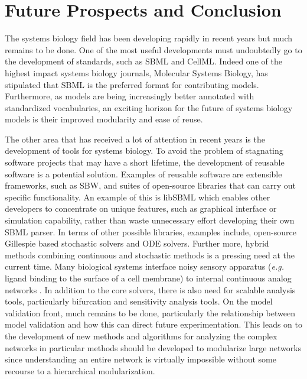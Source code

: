 \documentclass[]{article}
\begin{document}
\section{Future Prospects and Conclusion}

The systems biology field has been developing rapidly in recent years
but much remains to be done. One of the most useful developments must
undoubtedly go to the development of standards, such as SBML and CellML.
Indeed one of the highest impact systems biology journals, Molecular
Systems Biology, has stipulated that SBML is the preferred format for
contributing models. Furthermore, as models are being increasingly
better annotated with standardized vocabularies, an exciting horizon for
the future of systems biology models is their improved modularity and
ease of reuse.

The other area that has received a lot of attention in recent years is
the development of tools for systems biology. To avoid the problem of
stagnating software projects that may have a short lifetime, the
development of reusable software is a potential solution. Examples of
reusable software are extensible frameworks, such as SBW, and suites of
open-source libraries that can carry out specific functionality. An
example of this is libSBML which enables other developers to concentrate
on unique features, such as graphical interface or simulation
capability, rather than waste unnecessary effort developing their own
SBML parser. In terms of other possible libraries, examples include,
open-source Gillespie based stochastic solvers and ODE solvers. Further
more, hybrid methods combining continuous and stochastic methods is a
pressing need at the current time. Many biological systems interface
noisy sensory apparatus (\emph{e.g.} ligand binding to the surface of a
cell membrane) to internal continuous analog networks
\autocite{SauroReview:2004}. In addition to the core solvers, there is
also need for scalable analysis tools, particularly bifurcation and
sensitivity analysis tools. On the model validation front, much remains
to be done, particularly the relationship between model validation and
how this can direct future experimentation. This leads on to the
development of new methods and algorithms for analyzing the complex
networks in particular methods should be developed to modularize large
networks since understanding an entire network is virtually impossible
without some recourse to a hierarchical modularization.
\end{document}
